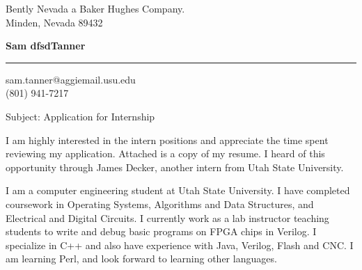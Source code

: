 \documentclass{letter} %
\begin{document}
\signature{Sam Tanner}           %
\longindentation=0pt                       %
\let\raggedleft\raggedright                %
 
\begin{large}
\begin{letter}{Bently Nevada a Baker Hughes Company.\\
Minden, Nevada 89432}


\begin{flushleft}
{\LARGE\bf Sam dfsdTanner}
\end{flushleft}
\medskip\hrule height 1pt
\begin{flushright}
\hfill sam.tanner@aggiemail.usu.edu \\
\hfill (801) 941-7217 
\end{flushright} 
\vfill %

 
\opening{Subject: Application for Internship\\} 
 
\noindent I am highly interested in the intern positions and appreciate the time spent reviewing my application.  Attached is a copy of my resume. I heard of this opportunity through James Decker, another intern from Utah State University.
 

 
\noindent 

I am a computer engineering student at Utah State University. I have completed coursework in
Operating Systems, Algorithms and Data Structures, and Electrical and Digital Circuits. I currently work as a lab instructor teaching students to write and debug basic programs on FPGA chips in Verilog. I specialize in C++ and also have experience with Java, Verilog, Flash and CNC. I am learning Perl, and look forward to learning other languages.


 

\end{letter}
\end{large}
\end{document}
